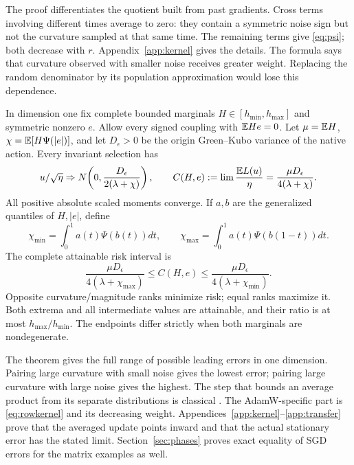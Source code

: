 The proof differentiates the quotient built from past gradients. Cross
terms involving different times average to zero: they contain a symmetric
noise sign but not the curvature sampled at that same time. The remaining
terms give \eqref{eq:psi}; both decrease with $r$.
Appendix~\ref{app:kernel} gives the details. The formula says that curvature
observed with smaller noise receives greater weight. Replacing the random
denominator by its population approximation would lose this dependence.

\begin{theorem}\label{thm:scalar}
In dimension one fix complete bounded marginals $H\in[h_{\min},h_{\max}]$
and symmetric nonzero $e$. Allow every signed coupling with $\mathbb E He=0$.
Let $\mu=\mathbb E H$, $\chi=\mathbb E[H\Psi(|e|)]$, and let $D_\epsilon>0$ be the
origin Green--Kubo variance of the native action. Every invariant selection has
\[
 u/\sqrt\eta\Rightarrow N\!\left(0,\frac{D_\epsilon}{2(\lambda+\chi)}\right),
 \qquad C(H,e):=\lim\frac{\mathbb E L(u)}\eta
       =\frac{\mu D_\epsilon}{4(\lambda+\chi)}.
\]
All positive absolute scaled moments converge. If $a,b$ are the generalized
quantiles of $H,|e|$, define
\[
 \chi_{\min}=\int_0^1a(t)\Psi(b(t))dt,
 \qquad \chi_{\max}=\int_0^1a(t)\Psi(b(1-t))dt.
\]
The complete attainable risk interval is
\[
 \frac{\mu D_\epsilon}{4(\lambda+\chi_{\max})}
 \leq C(H,e)\leq
 \frac{\mu D_\epsilon}{4(\lambda+\chi_{\min})}.
\]
Opposite curvature/magnitude ranks minimize risk; equal ranks maximize it.
Both extrema and all intermediate values are attainable, and their ratio is
at most $h_{\max}/h_{\min}$. The endpoints differ strictly when both
marginals are nondegenerate.
\end{theorem}

The theorem gives the full range of possible leading errors in one
dimension. Pairing large curvature with small noise gives the lowest error;
pairing large curvature with large noise gives the highest. The step that
bounds an average product from its separate distributions is classical
\cite{cambanissimonsstout1976}. The AdamW-specific part is \eqref{eq:rowkernel} and
its decreasing weight. Appendices~\ref{app:kernel}--\ref{app:transfer}
prove that the averaged update points inward and that the actual stationary
error has the stated limit. Section~\ref{sec:phases} proves exact equality
of SGD errors for the matrix examples as well.

